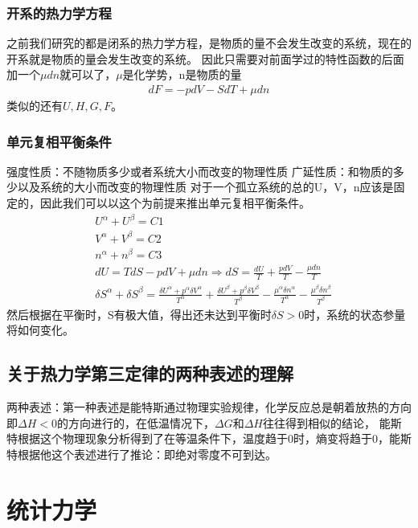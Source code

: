 \documentclass[UTF8]{ctexart}
\begin{document}
\subsubsection{开系的热力学方程}
之前我们研究的都是闭系的热力学方程，是物质的量不会发生改变的系统，现在的开系就是物质的量会发生改变的系统。
因此只需要对前面学过的特性函数的后面加一个$\mu dn$就可以了，$\mu$是化学势，n是物质的量
\begin{align*}
        dF=-pdV-SdT+\mu dn
\end{align*}
类似的还有$U,H,G,F$。
\subsubsection{单元复相平衡条件}
强度性质：不随物质多少或者系统大小而改变的物理性质
广延性质：和物质的多少以及系统的大小而改变的物理性质
对于一个孤立系统的总的U，V，n应该是固定的，因此我们可以以这个为前提来推出单元复相平衡条件。
\begin{align*}
         & U^\alpha+U^\beta=C1                                                                         \\
         & V^\alpha+V^\beta=C2                                                                         \\
         & n^\alpha+n^\beta=C3                                                                         \\
         & dU=TdS-pdV+\mu dn\Rightarrow dS=\frac{dU}{T}+\frac{pdV}{T}-\frac{\mu dn}{T}                 \\
         & \delta S^\alpha +\delta S^\beta = \frac{\delta U^\alpha+p^\alpha \delta V^\alpha}{T^\alpha}
        +\frac{\delta U^\beta+p^\beta \delta V^\beta}{T^\beta}
        -\frac{\mu ^\alpha \delta n^\alpha}{T^\alpha}-\frac{\mu ^\beta \delta n^\beta}{T^\beta}
\end{align*}
然后根据在平衡时，S有极大值，得出还未达到平衡时$\delta S>0$时，系统的状态参量将如何变化。
\subsection{关于热力学第三定律的两种表述的理解}
两种表述：第一种表述是能特斯通过物理实验规律，化学反应总是朝着放热的方向即$\Delta H<0$的方向进行的，在低温情况下，$\Delta G$和$\Delta H$往往得到相似的结论，
能斯特根据这个物理现象分析得到了在等温条件下，温度趋于0时，熵变将趋于0，能斯特根据他这个表述进行了推论：即绝对零度不可到达。
\section{统计力学}
\end{document}
